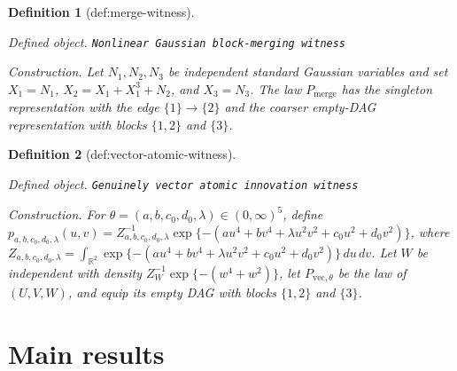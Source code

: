 \documentclass{article}
\newtheorem{definition}{Definition}
\begin{document}
\begin{definition}[def:merge-witness]\label{def:merge-witness}
\par\smallskip\noindent\emph{Defined object.} \texttt{Nonlinear Gaussian block-\allowbreak{}merging witness}
\par\smallskip\noindent\emph{Construction.} Let \(N_1,N_2,N_3\) be independent standard Gaussian variables and set \(X_1=N_1\), \(X_2=X_1+X_1^3+N_2\), and \(X_3=N_3\). The law \(P_{\mathrm{merge}}\) has the singleton representation with the edge \(\{1\}\to\{2\}\) and the coarser empty-DAG representation with blocks \(\{1,2\}\) and \(\{3\}\).
\end{definition}

\begin{definition}[def:vector-atomic-witness]\label{def:vector-atomic-witness}
\par\smallskip\noindent\emph{Defined object.} \texttt{Genuinely vector atomic innovation witness}
\par\smallskip\noindent\emph{Construction.} For \(\theta=(a,b,c_0,d_0,\lambda)\in(0,\infty)^5\), define \(p_{a,b,c_0,d_0,\lambda}(u,v)=Z_{a,b,c_0,d_0,\lambda}^{-1}\exp\{-(a u^4+b v^4+\lambda u^2v^2+c_0u^2+d_0v^2)\}\), where \(Z_{a,b,c_0,d_0,\lambda}=\int_{\mathbb R^2}\exp\{-(a u^4+b v^4+\lambda u^2v^2+c_0u^2+d_0v^2)\}\,du\,dv\). Let \(W\) be independent with density \(Z_W^{-1}\exp\{-(w^4+w^2)\}\), let \(P_{\mathrm{vec},\theta}\) be the law of \((U,V,W)\), and equip its empty DAG with blocks \(\{1,2\}\) and \(\{3\}\).
\end{definition}

\section{Main results}
\end{document}

